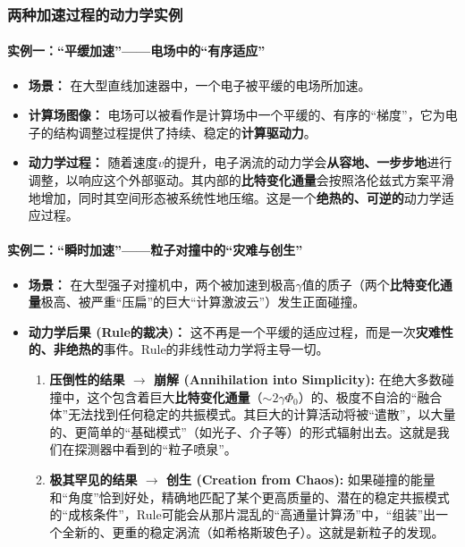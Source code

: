 \documentclass[11pt, a4paper]{article}
\begin{document}
\subsubsection*{两种加速过程的动力学实例}

\paragraph{实例一：“平缓加速”——电场中的“有序适应”}
\begin{itemize}
    \item \textbf{场景：} 在大型直线加速器中，一个电子被平缓的电场所加速。
    \item \textbf{计算场图像：} 电场可以被看作是计算场中一个平缓的、有序的“梯度”，它为电子的结构调整过程提供了持续、稳定的\textbf{计算驱动力}。
    \item \textbf{动力学过程：} 随着速度$v$的提升，电子涡流的动力学会\textbf{从容地、一步步地}进行调整，以响应这个外部驱动。其内部的\textbf{比特变化通量}会按照洛伦兹式方案平滑地增加，同时其空间形态被系统性地压缩。这是一个\textbf{绝热的、可逆的}动力学适应过程。
\end{itemize}

\paragraph{实例二：“瞬时加速”——粒子对撞中的“灾难与创生”}
\begin{itemize}
    \item \textbf{场景：} 在大型强子对撞机中，两个被加速到极高$\gamma$值的质子（两个\textbf{比特变化通量}极高、被严重“压扁”的巨大“计算激波云”）发生正面碰撞。
    \item \textbf{动力学后果 (Rule的裁决)：} 这不再是一个平缓的适应过程，而是一次\textbf{灾难性的、非绝热的}事件。Rule的非线性动力学将主导一切。
    \begin{enumerate}
        \item \textbf{压倒性的结果 $\rightarrow$ 崩解 (Annihilation into Simplicity):} 在绝大多数碰撞中，这个包含着巨大\textbf{比特变化通量}（$\sim 2\gamma\Phi_0$）的、极度不自洽的“融合体”无法找到任何稳定的共振模式。其巨大的计算活动将被“遣散”，以大量的、更简单的“基础模式”（如光子、介子等）的形式辐射出去。这就是我们在探测器中看到的“粒子喷泉”。
        \item \textbf{极其罕见的结果 $\rightarrow$ 创生 (Creation from Chaos):} 如果碰撞的能量和“角度”恰到好处，精确地匹配了某个更高质量的、潜在的稳定共振模式的“成核条件”，Rule可能会从那片混乱的“高通量计算汤”中，“组装”出一个全新的、更重的稳定涡流（如希格斯玻色子）。这就是新粒子的发现。
    \end{enumerate}
\end{itemize}
\end{document}
